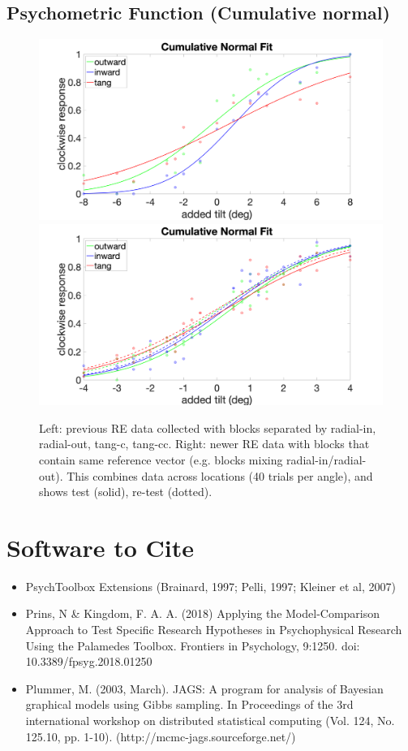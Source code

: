 \documentclass[11pt]{article} %
\begin{document}
\subsection{Psychometric Function (Cumulative normal)}
\begin{figure}[H]
\centering %
\includegraphics[scale=.08]{Images/PF_angles_old.png}
\includegraphics[scale=.08]{Images/PF_overlayed.png}
\caption{Left: previous RE data collected with blocks separated by radial-in, radial-out, tang-c, tang-cc. Right: newer RE data with blocks that contain same reference vector (e.g. blocks mixing radial-in/radial-out). This combines data across locations (40 trials per angle), and shows test (solid), re-test (dotted).}
\end{figure}

\section{Software to Cite}
\begin{itemize}
\item PsychToolbox Extensions (Brainard, 1997; Pelli, 1997; Kleiner et al, 2007)
\item Prins, N \& Kingdom, F. A. A. (2018) Applying the Model-Comparison Approach to Test Specific Research Hypotheses in Psychophysical Research Using the Palamedes Toolbox. Frontiers in Psychology, 9:1250. doi: 10.3389/fpsyg.2018.01250
\item Plummer, M. (2003, March). JAGS: A program for analysis of Bayesian graphical models using Gibbs sampling. In Proceedings of the 3rd international workshop on distributed statistical computing (Vol. 124, No. 125.10, pp. 1-10). (http://mcmc-jags.sourceforge.net/)
\end{itemize}
\end{document}
